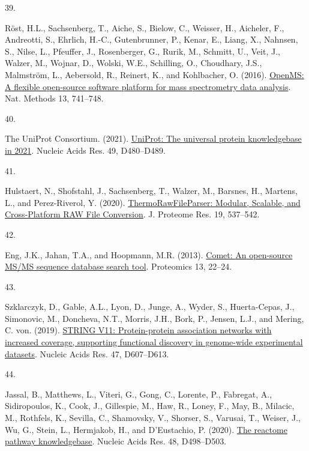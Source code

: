 \documentclass[
]{article}
\newlength{\cslhangindent}
\newlength{\csllabelwidth}
\newlength{\cslentryspacingunit} %
\newenvironment{CSLReferences}[2] %
 {%
  \setlength{\parindent}{0pt}
  \ifodd #1
  \let\oldpar\par
  \def\par{\hangindent=\cslhangindent\oldpar}
  \fi
  \setlength{\parskip}{#2\cslentryspacingunit}
 }%
 {}
\newcommand{\CSLLeftMargin}[1]{\parbox[t]{\csllabelwidth}{#1}}
\newcommand{\CSLRightInline}[1]{\parbox[t]{\linewidth - \csllabelwidth}{#1}\break}
\begin{document}
\begin{CSLReferences}{0}{0}
\leavevmode{}%
\CSLLeftMargin{39. }
\CSLRightInline{Röst, H.L., Sachsenberg, T., Aiche, S., Bielow, C., Weisser, H., Aicheler, F., Andreotti, S., Ehrlich, H.-C., Gutenbrunner, P., Kenar, E., Liang, X., Nahnsen, S., Nilse, L., Pfeuffer, J., Rosenberger, G., Rurik, M., Schmitt, U., Veit, J., Walzer, M., Wojnar, D., Wolski, W.E., Schilling, O., Choudhary, J.S., Malmström, L., Aebersold, R., Reinert, K., and Kohlbacher, O. (2016). \href{https://doi.org/10.1038/nmeth.3959}{{OpenMS}: A flexible open-source software platform for mass spectrometry data analysis}. Nat. Methods 13, 741--748.}

\leavevmode{}%
\CSLLeftMargin{40. }
\CSLRightInline{The UniProt Consortium. (2021). \href{https://doi.org/10.1093/nar/gkaa1100}{{UniProt}: The universal protein knowledgebase in 2021}. Nucleic Acids Res. 49, D480--D489.}

\leavevmode{}%
\CSLLeftMargin{41. }
\CSLRightInline{Hulstaert, N., Shofstahl, J., Sachsenberg, T., Walzer, M., Barsnes, H., Martens, L., and Perez-Riverol, Y. (2020). \href{https://doi.org/10.1021/acs.jproteome.9b00328}{{ThermoRawFileParser}: {Modular}, {Scalable}, and {Cross-Platform RAW File Conversion}}. J. Proteome Res. 19, 537--542.}

\leavevmode{}%
\CSLLeftMargin{42. }
\CSLRightInline{Eng, J.K., Jahan, T.A., and Hoopmann, M.R. (2013). \href{https://doi.org/10.1002/pmic.201200439}{Comet: {An} open-source {MS}/{MS} sequence database search tool}. Proteomics 13, 22--24.}

\leavevmode{}%
\CSLLeftMargin{43. }
\CSLRightInline{Szklarczyk, D., Gable, A.L., Lyon, D., Junge, A., Wyder, S., Huerta-Cepas, J., Simonovic, M., Doncheva, N.T., Morris, J.H., Bork, P., Jensen, L.J., and Mering, C. von. (2019). \href{https://doi.org/10.1093/nar/gky1131}{{STRING} V11: Protein-protein association networks with increased coverage, supporting functional discovery in genome-wide experimental datasets}. Nucleic Acids Res. 47, D607--D613.}

\leavevmode{}%
\CSLLeftMargin{44. }
\CSLRightInline{Jassal, B., Matthews, L., Viteri, G., Gong, C., Lorente, P., Fabregat, A., Sidiropoulos, K., Cook, J., Gillespie, M., Haw, R., Loney, F., May, B., Milacic, M., Rothfels, K., Sevilla, C., Shamovsky, V., Shorser, S., Varusai, T., Weiser, J., Wu, G., Stein, L., Hermjakob, H., and D'Eustachio, P. (2020). \href{https://doi.org/10.1093/nar/gkz1031}{The reactome pathway knowledgebase}. Nucleic Acids Res. 48, D498--D503.}


\end{CSLReferences}
\end{document}
